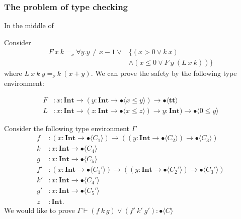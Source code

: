 \documentclass[runningheads]{llncs}
\newcommand \true {\textbf{tt}}
\newcommand \stypeint {\textbf{Int}}
\newcommand \stypebool {\bullet}
\newcommand \typeint[1]{{#1} : \stypeint}
\newcommand \typebool[1]{\stypebool \langle #1 \rangle}
\begin{document}
\subsubsection{The problem of type checking}

In the middle of

Consider
\begin{align*}
    F\ x\ k =_\nu \forall y. y \neq x - 1 \lor
        & \{ (x > 0 \lor k\ x)\\
        & \land ( x \leq 0 \lor F\ y\ (L\ x\ k)) \}
\end{align*}
where \( L\ x\ k\ y =_\nu k\ (x + y) \).
We can prove the safety by the following type environment:

\begin{align*}
    F&: \typeint{x} \to (\typeint{y} \to \typebool{x \leq y}) \to
    \typebool{\true}\\
    L&: \typeint{x} \to (\typeint{z} \to \typebool{x \leq z}) \to
    \typeint{y}) \to \typebool{0 \leq y}
\end{align*}

Consider the following type environment \(\Gamma\)
\begin{align*}
    f&: (\typeint{x} \to \typebool{C_1}) \to ((\typeint{y} \to \typebool{C_2})
    \to \typebool{C_3})\\
    k&: \typeint{x} \to \typebool{C_4}\\
    g&: \typeint{x} \to \typebool{C_5}\\
    f'&: (\typeint{x} \to \typebool{C_1'}) \to ((\typeint{y} \to \typebool{C_2'})
    \to \typebool{C_3'})\\
    k'&: \typeint{x} \to \typebool{C_4'}\\
    g'&: \typeint{x} \to \typebool{C_5'}\\
    z&: \stypeint.
\end{align*}
We would like to prove \( \Gamma \vdash (f\ k\ g) \lor (f'\ k'\ g'):
\typebool{C}\)
\end{document}
